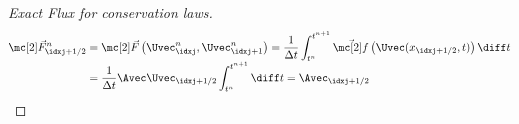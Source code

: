 \begin{proofbox}\nospacing
    \begin{proof}[Exact Flux for conservation laws]\label{proof:exact_flux_for_conservation_laws}
        \begin{align*}
          \Fluxvec^{n}_{\idxj+1/2}&=\Fluxvec\left(\Uvec_{\idxj}^{n},\Uvec_{\idxj+1}^{n}\right)
          =\frac{1}{\Delta t}\int_{t^{n}}^{t^{n+1}}\vec{\flux}\left(\Uvec(x_{\idxj+1/2},t)\right)\diff t \\[-1\jot]
          &=\frac{1}{\Delta t}\Avec\Uvec_{\idxj+1/2}\int_{t^{n}}^{t^{n+1}}\diff t
          =\Avec_{\idxj+1/2}
        \end{align*}
    \end{proof}
\end{proofbox}
